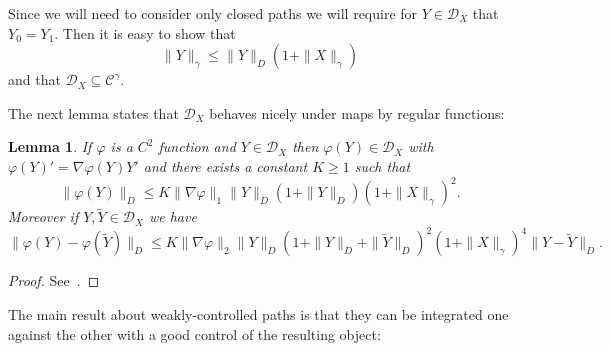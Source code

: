 \documentclass[a4paper,12pt,reqno]{amsart}
\newcommand{\wt}{\widetilde}
\newtheorem{lemma}{Lemma}
\newcommand{\CC}{\mathscr{C}}
\newcommand{\DX}{\mathscr{D}_{X}}
\begin{document}
Since we will need to consider only closed paths we will require for $Y
\in \DX$ that $Y_0 = Y_1$. Then it is easy to show that
$$
\|Y\|_\gamma \le \|Y\|_{D} (1+\|X\|_\gamma)
$$
and that $\DX \subseteq \CC^\gamma$.

The next lemma states that $\DX$ behaves nicely under maps by regular functions:
\begin{lemma}
\label{lemma:stability-D}
If $\varphi$ is a $C^2$ function and $Y \in \DX$ then $\varphi(Y) \in
\DX$ with $\varphi(Y)' = \nabla \varphi(Y) Y'$ and there exists a
constant $K \ge 1$ such that
\begin{equation}
  \label{eq:bound-varphi-y}
\|\varphi(Y)\|_D \le K \|\nabla \varphi\|_1 \|Y\|_D (1+\|Y\|_D) (1+\|X\|_\gamma)^2.
\end{equation}
Moreover if $Y, \wt Y \in \DX$ we have
\begin{equation}
  \label{eq:bound-varphi-y-diff}
\|\varphi(Y)-\varphi(\wt Y)\|_D \le K \|\nabla \varphi\|_2 \|Y\|_D
(1+\|Y\|_D+\|\wt Y\|_D)^2 (1+\|X\|_\gamma)^4 \|Y-\wt Y\|_D.
\end{equation}
\end{lemma}
\begin{proof}
See~\cite[Prop. 4]{Gubinelli}.  
\end{proof}



The main result about weakly-controlled paths is that they can be
integrated one against the other with a good control of the resulting
object:
\end{document}
